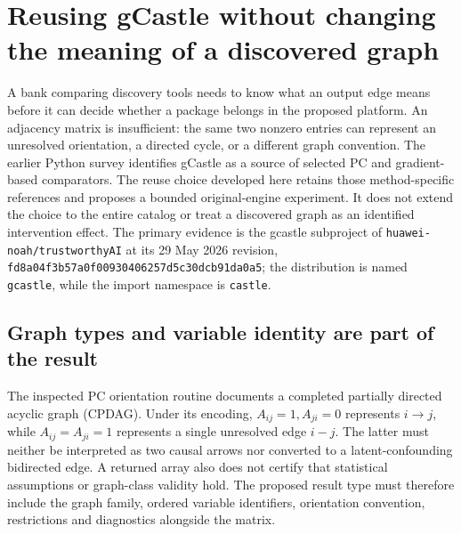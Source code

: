 \section{Reusing gCastle without changing the meaning of a discovered graph}
\label{exec20:gcastle-scope}

A bank comparing discovery tools needs to know what an output edge means before
it can decide whether a package belongs in the proposed platform. An adjacency
matrix is insufficient: the same two nonzero entries can represent an unresolved
orientation, a directed cycle, or a different graph convention. The earlier
Python survey identifies gCastle as a source of selected PC and gradient-based
comparators. The reuse choice developed here retains those method-specific
references and proposes a bounded original-engine experiment. It does not extend
the choice to the entire catalog or treat a discovered graph as an identified
intervention effect. The primary evidence is the gcastle subproject of
\texttt{huawei-noah/trustworthyAI} at its 29 May 2026 revision,
\texttt{fd8a04f3b57a0f00930406257d5c30dcb91da0a5}; the distribution is named
\texttt{gcastle}, while the import namespace is \texttt{castle}.
\citep{exec20_gcastle_source}

\subsection{Graph types and variable identity are part of the result}
\label{exec20:gcastle-encoding}

The inspected PC orientation routine documents a completed partially directed
acyclic graph (CPDAG). Under its encoding, $A_{ij}=1,A_{ji}=0$ represents
$i\to j$, while $A_{ij}=A_{ji}=1$ represents a single unresolved edge $i-j$.
The latter must neither be interpreted as two causal arrows nor converted to a
latent-confounding bidirected edge. A returned array also does not certify that
statistical assumptions or graph-class validity hold. The proposed result type
must therefore include the graph family, ordered variable identifiers,
orientation convention, restrictions and diagnostics alongside the matrix.
\citep{exec20_gcastle_source}

